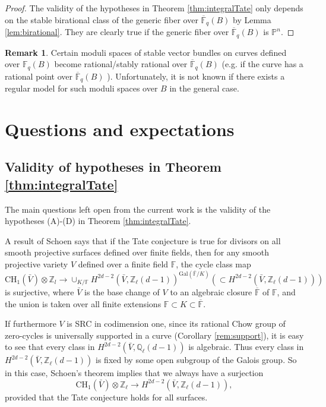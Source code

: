 \documentclass{amsart}
\theoremstyle{definition}
\newtheorem{rem}[theorem]{Remark}
\theoremstyle{remark}
\newcommand{\mbb}{\mathbb}
\newcommand{\FF}{\mbb{F}}
\newcommand{\QQ}{\mbb{Q}}
\newcommand{\ZZ}{\mbb{Z}}
\newcommand{\PP}{\mbb{P}}
\begin{document}
\begin{proof}
The validity of the hypotheses in Theorem \ref{thm:integralTate} only depends on the stable birational class of the generic fiber over $\overline{\FF}_q(B)$ by Lemma \ref{lem:birational}. They are clearly true if the generic fiber over $\overline{\FF}_q(B)$ is $\PP^n$.
\end{proof}



\begin{rem}
    Certain moduli spaces of stable vector bundles on curves defined over $\FF_q(B)$ become rational/stably rational over $\overline{\FF}_q(B)$ (e.g. if the curve has a rational point over $\overline{\FF}_q(B)$ \cite[Corollary 6.2]{ Hoffmann_rationality}). 
    Unfortunately, it is not known if there exists a regular model for such moduli spaces over $B$ in the general case.
\end{rem}

\section{Questions and expectations}\label{sec:questions}
\subsection{Validity of hypotheses in Theorem \ref{thm:integralTate}} The main questions left open from the current work is the validity of the hypotheses (A)-(D) in Theorem \ref{thm:integralTate}.

A result of Schoen \cite{SchoenIntegralTate} says that if the Tate conjecture is true for divisors on all smooth projective surfaces defined over finite fields, then for any smooth projective variety $V$ defined over a finite field $\FF$, the cycle class map
 \[
 \text{CH}_1(\bar{V})\otimes \ZZ_l \to \cup_{K/\FF} H^{2d-2}(\bar{V}, \ZZ_\ell(d-1))^{\text{Gal}(\bar{\FF}/K)}(\subset H^{2d-2}(\bar{V}, \ZZ_\ell(d-1)))
 \]
 is surjective, where $\bar{V}$ is the base change of $V$ to an algebraic closure $\overline{\FF}$ of $\FF$, and the union is taken over all finite extensions $\FF\subset K \subset \overline{\FF}$. 
 
 
 If furthermore $V$ is SRC in codimension one, since its rational Chow group of zero-cycles is universally supported in a curve (Corollary \ref{rem:support}), it is easy to see that every class in $H^{2d-2}(\bar{V}, \QQ_\ell(d-1))$ is algebraic. Thus every class in $H^{2d-2}(\bar{V}, \ZZ_\ell(d-1))$ is fixed by some open subgroup of the Galois group.
 So in this case, Schoen's theorem implies that  we always have a surjection
 \[
 \text{CH}_1(\bar{V}) \otimes \ZZ_\ell \to H^{2d-2}(\bar{V}, \ZZ_\ell(d-1)), 
 \]
 provided that the Tate conjecture holds for all surfaces.
 
\end{document}
